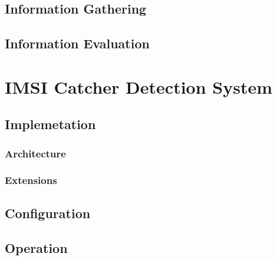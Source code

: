 \subsection{Information Gathering}
\label{sec:info_gathering}
\subsection{Information Evaluation}

\section{IMSI Catcher Detection System}
\label{sec:icds}
\subsection{Implemetation}
\subsubsection{Architecture}
\subsubsection{Extensions}
\subsection{Configuration}
\subsection{Operation}